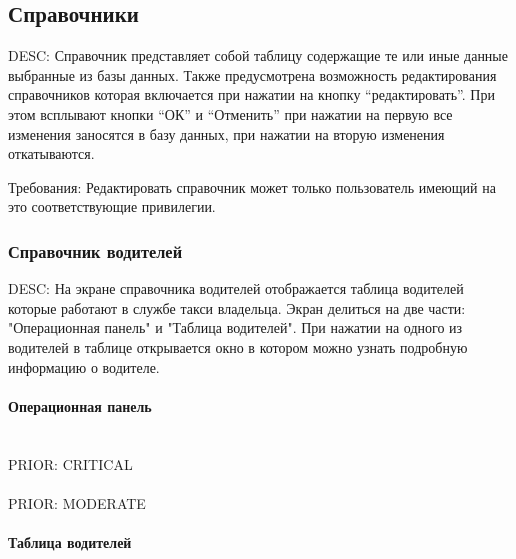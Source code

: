 \subsection{Справочники}
	
	DESC:  Справочник представляет собой таблицу содержащие те или иные данные выбранные из базы данных. Также предусмотрена возможность редактирования справочников которая включается при нажатии на кнопку “редактировать”. При этом всплывают кнопки “ОК” и “Отменить” при нажатии на первую все изменения заносятся в базу данных, при нажатии на вторую изменения откатываются.

	Требования:
		Редактировать справочник может только пользователь имеющий на это соответствующие привилегии.


	\subsubsection{Справочник водителей}

		DESC: На экране справочника водителей отображается таблица водителей которые работают в службе такси владельца. Экран делиться на две части: "Операционная панель" и "Таблица водителей". При нажатии на одного из водителей в таблице открывается окно в котором можно узнать подробную информацию о водителе.

		\paragraph{Операционная панель} \mbox{} \\

			PRIOR: CRITICAL \\

			 \\
			PRIOR: MODERATE \\


		\paragraph{Таблица водителей} \mbox{} \\

